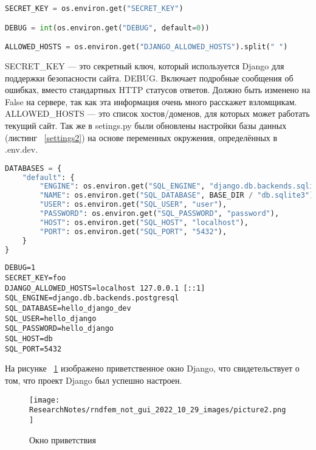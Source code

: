 \begin{lstlisting}[frame=single, label={settings1}, caption={Обновлённые переменные в \textsf{settings.py}}, language=Python] 
SECRET_KEY = os.environ.get("SECRET_KEY")

DEBUG = int(os.environ.get("DEBUG", default=0))

ALLOWED_HOSTS = os.environ.get("DJANGO_ALLOWED_HOSTS").split(" ")
\end{lstlisting}

	\textsf{SECRET_KEY} — это секретный ключ, который используется Django для поддержки безопасности сайта.
	\textsf{DEBUG}. Включает подробные сообщения об ошибках, вместо стандартных \textsf{HTTP} статусов ответов. Должно быть изменено на \textsf{False} на сервере, так как эта информация очень много расскажет взломщикам.
	\textsf{ALLOWED_HOSTS} — это список хостов/доменов, для которых может работать текущий сайт.
	Так же в \textsf{setings.py} были обновлены настройки базы данных (листинг ~\ref{settings2}) на основе переменных окружения, определённых в \textsf{.env.dev}.

\begin{lstlisting}[frame=single, label={settings2}, caption={Обновлённые переменные в \textsf{settings.py}}, language=Python] 
DATABASES = {
    "default": {
        "ENGINE": os.environ.get("SQL_ENGINE", "django.db.backends.sqlite3"),
        "NAME": os.environ.get("SQL_DATABASE", BASE_DIR / "db.sqlite3"),
        "USER": os.environ.get("SQL_USER", "user"),
        "PASSWORD": os.environ.get("SQL_PASSWORD", "password"),
        "HOST": os.environ.get("SQL_HOST", "localhost"),
        "PORT": os.environ.get("SQL_PORT", "5432"),
    }
}
\end{lstlisting}

\begin{lstlisting}[frame=single, label={.env.dev}, caption={Содержимое файла \textsf{.env.dev}}, language=.env.dev] 
DEBUG=1
SECRET_KEY=foo
DJANGO_ALLOWED_HOSTS=localhost 127.0.0.1 [::1]
SQL_ENGINE=django.db.backends.postgresql
SQL_DATABASE=hello_django_dev
SQL_USER=hello_django
SQL_PASSWORD=hello_django
SQL_HOST=db
SQL_PORT=5432
\end{lstlisting}

	На рисунке ~\ref{picture2} изображено приветственное окно \textsf{Django}, что свидетельствует о том, что проект \textsf{Django} был успешно настроен.

\begin{figure}[!ht]
  \centering
  \texttt{[image: ResearchNotes/rndfem\_not\_gui\_2022\_10\_29\_images/picture2.png]}
  \caption{Окно приветствия}
  \label{picture2}
\end{figure}

